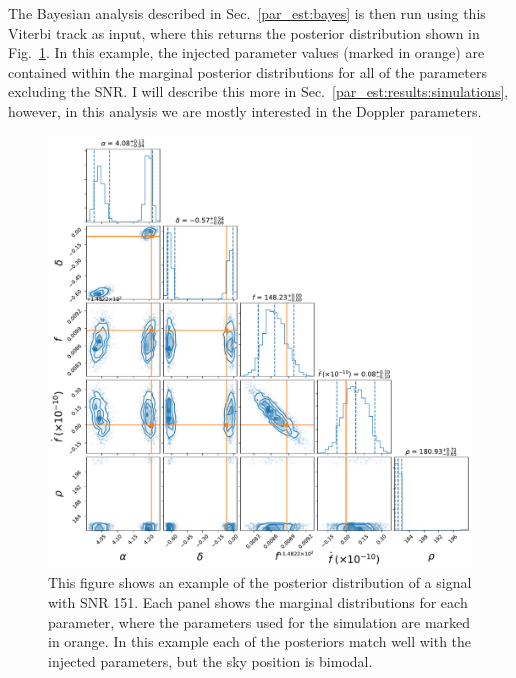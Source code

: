 The Bayesian analysis described in Sec.~\ref{par_est:bayes} is then run using this Viterbi track as input, where this returns the posterior distribution shown in Fig.~\ref{par_est:results:example_posterior}.
In this example, the injected parameter values (marked in orange) are contained within the marginal posterior distributions for all of the parameters excluding the \gls{SNR}.
I will describe this more in Sec.~\ref{par_est:results:simulations}, however, in this analysis we are mostly interested in the Doppler parameters.
%
\begin{figure}[pt]

    \centering
    \includegraphics[width=\linewidth]{C5_parameter/cornerplot.pdf}
    \caption[KDE of likelihood in different \gls{SNR} ranges]{This figure shows an example of the posterior distribution of a signal with \gls{SNR} 151. Each panel shows the marginal distributions for each parameter, where the parameters used for the simulation are marked in orange. In this example each of the posteriors match well with the injected parameters, but the sky position is bimodal. }
    \label{par_est:results:example_posterior}
    
\end{figure}
%

